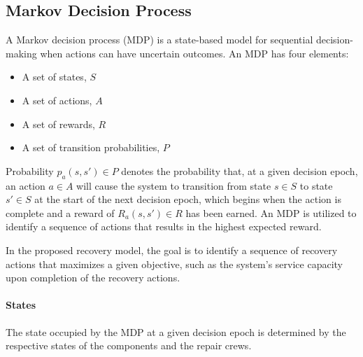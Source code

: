 \documentclass[runningheads]{llncs}
\begin{document}

 
\subsection{Markov Decision Process}\label{sec:mdp}

A Markov decision process (MDP) is a state-based model for sequential decision-making when actions can have uncertain outcomes. An MDP has four elements:

\begin{itemize}
    \item A set of states, $S$
    \item A set of actions, $A$
    \item A set of rewards, $R$
    \item A set of transition probabilities, $P$
\end{itemize}

 Probability $p_a(s,s') \in P$ denotes the probability that, at a given decision epoch, an action $a \in A$ will cause the system to transition from state $s \in S$ to state $s' \in S$ at the start of the next decision epoch, which begins when the action is complete and a reward of $R_a(s,s') \in R$ has been earned. An MDP is utilized to identify a sequence of actions that results in the highest expected reward. 

 In the proposed recovery model, the goal is to identify a sequence of recovery actions that maximizes a given objective, such as the system's service capacity upon completion of the recovery actions. 

\paragraph{States}
The state occupied by the MDP at a given decision epoch is determined by the respective states of the components and the repair crews.
 
\end{document}
